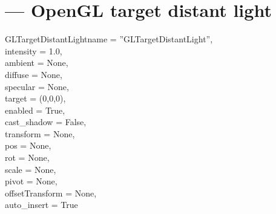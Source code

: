 
\section{ ---
         OpenGL target distant light}

\begin{classdesc}{GLTargetDistantLight}{name = ''GLTargetDistantLight'',\\ 
                       intensity = 1.0,\\
                       ambient = None,\\
                       diffuse = None,\\
                       specular = None,\\
                       target = (0,0,0),\\
                       enabled = True,\\
                       cast_shadow = False,\\
                       transform = None,\\
                       pos = None,\\
                       rot = None,\\
                       scale = None,\\
                       pivot = None,\\
                       offsetTransform = None,\\
                       auto_insert = True}

\end{classdesc}


